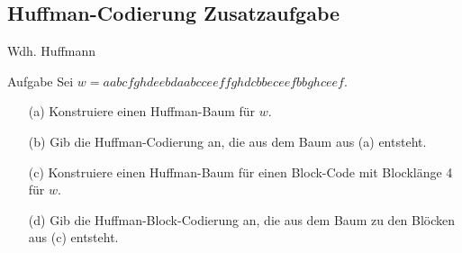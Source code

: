 \subsection{Huffman-Codierung Zusatzaufgabe}
\begin{frame}{Wdh. Huffmann}
	\begin{exampleblock}{Aufgabe}
		Sei $w = aabc fghd eebd aabc ceef fghd cbbe ceef bbgh ceef$.\\
		\begin{enumerate}
			\item[(a)] Konstruiere einen Huffman-Baum für $w$.
			\item[(b)] Gib die Huffman-Codierung an, die aus dem Baum aus (a) entsteht.
			\item[(c)] Konstruiere einen Huffman-Baum für einen Block-Code mit Blocklänge 4 für $w$.
			\item[(d)] Gib die Huffman-Block-Codierung an, die aus dem Baum zu den Blöcken aus (c) entsteht.
		\end{enumerate}
	\end{exampleblock}
\end{frame}